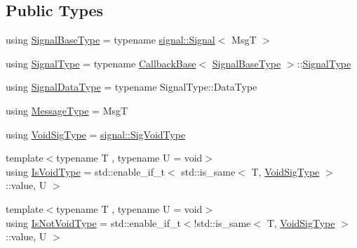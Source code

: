 \subsection*{Public Types}
\begin{DoxyCompactItemize}
\item 
using \hyperlink{structvt_1_1pipe_1_1callback_1_1_callback_send_a2c84bc6c3e3fb18ece98bc3f2983a902}{Signal\+Base\+Type} = typename \hyperlink{structvt_1_1pipe_1_1signal_1_1_signal}{signal\+::\+Signal}$<$ MsgT $>$
\item 
using \hyperlink{structvt_1_1pipe_1_1callback_1_1_callback_send_a73748b762ebaaf0f1142aa90ecd9880b}{Signal\+Type} = typename \hyperlink{structvt_1_1pipe_1_1callback_1_1_callback_base}{Callback\+Base}$<$ \hyperlink{structvt_1_1pipe_1_1callback_1_1_callback_send_a2c84bc6c3e3fb18ece98bc3f2983a902}{Signal\+Base\+Type} $>$\+::\hyperlink{structvt_1_1pipe_1_1callback_1_1_callback_send_a73748b762ebaaf0f1142aa90ecd9880b}{Signal\+Type}
\item 
using \hyperlink{structvt_1_1pipe_1_1callback_1_1_callback_send_a5b21820f25b28f980921b1fe24d8a2dc}{Signal\+Data\+Type} = typename Signal\+Type\+::\+Data\+Type
\item 
using \hyperlink{structvt_1_1pipe_1_1callback_1_1_callback_send_a51055a9ab026f30ce82771829c6673ed}{Message\+Type} = MsgT
\item 
using \hyperlink{structvt_1_1pipe_1_1callback_1_1_callback_send_a4b1101ab77de5862de3b309c5d09b224}{Void\+Sig\+Type} = \hyperlink{namespacevt_1_1pipe_1_1signal_acbe257d1ae44f20fa9fd9b6ed3057caf}{signal\+::\+Sig\+Void\+Type}
\item 
{\footnotesize template$<$typename T , typename U  = void$>$ }\\using \hyperlink{structvt_1_1pipe_1_1callback_1_1_callback_send_afbb9475a84ba4a7b3db3c7493672dbe6}{Is\+Void\+Type} = std\+::enable\+\_\+if\+\_\+t$<$ std\+::is\+\_\+same$<$ T, \hyperlink{structvt_1_1pipe_1_1callback_1_1_callback_send_a4b1101ab77de5862de3b309c5d09b224}{Void\+Sig\+Type} $>$\+::value, U $>$
\item 
{\footnotesize template$<$typename T , typename U  = void$>$ }\\using \hyperlink{structvt_1_1pipe_1_1callback_1_1_callback_send_adb85e64e67e00aa71a9c173565dfb7dc}{Is\+Not\+Void\+Type} = std\+::enable\+\_\+if\+\_\+t$<$!std\+::is\+\_\+same$<$ T, \hyperlink{structvt_1_1pipe_1_1callback_1_1_callback_send_a4b1101ab77de5862de3b309c5d09b224}{Void\+Sig\+Type} $>$\+::value, U $>$
\end{DoxyCompactItemize}
